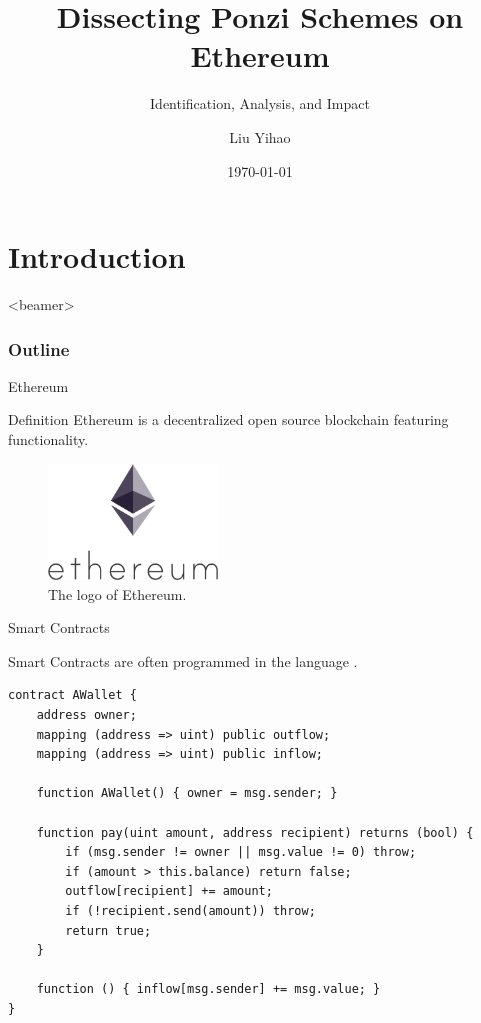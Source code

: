 \documentclass[aspectratio=169,10pt]{beamer}
\title{Dissecting Ponzi Schemes on Ethereum}
\subtitle{Identification, Analysis, and Impact\cite{bartoletti2020dissecting}}
\author{Liu Yihao}
\date{\today}
\begin{document}
\begin{frame}
  \titlepage
\end{frame}

\section{Introduction}

\begin{frame}<beamer>
    \frametitle{Outline}
    \tableofcontents[sectionstyle=show/shaded,subsectionstyle=show/shaded/shaded]
\end{frame}

\begin{frame}{Ethereum}

\begin{block}{Definition}
Ethereum\cite{wood2014ethereum} is a decentralized open source blockchain featuring  functionality.
\end{block}

\begin{figure}
    \centering
    \includegraphics[width=0.4\textwidth]{images/ethereum.png}
    \caption{The logo of Ethereum.}
    \label{fig:ethereum}
\end{figure}

\end{frame}

\begin{frame}[fragile]{Smart Contracts}

Smart Contracts are often programmed in the language \cite{dannen2017introducing}.

\pause

\begin{verbatim}
contract AWallet {
    address owner;
    mapping (address => uint) public outflow;
    mapping (address => uint) public inflow;

    function AWallet() { owner = msg.sender; }

    function pay(uint amount, address recipient) returns (bool) {
        if (msg.sender != owner || msg.value != 0) throw;
        if (amount > this.balance) return false;
        outflow[recipient] += amount;
        if (!recipient.send(amount)) throw;
        return true;
    }

    function () { inflow[msg.sender] += msg.value; }
}
\end{verbatim}

\end{frame}
\end{document}
